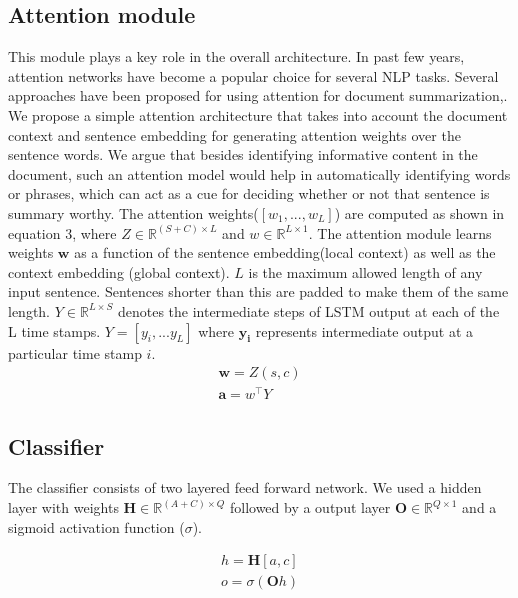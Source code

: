 \subsection{Attention module} This module plays a key role in the overall architecture. In past few years, attention networks have become a popular choice for several NLP tasks. Several approaches have been proposed for using attention for document summarization\cite{cheng2016neural},\cite{rush2015neural}. We propose a simple attention architecture that takes into account the document context and sentence embedding for generating attention weights over the sentence words. We argue that besides identifying informative content in the document, such an attention model would help in automatically identifying words or phrases, which can act as a cue for deciding whether or not that sentence is summary worthy. The attention weights($[w_1,...,w_L]$) are computed as shown in equation 3, where $Z \in \mathbb{R}^{(S+C)\times L}$ and $w \in \mathbb{R}^{L\times1}$. The attention module learns weights $\boldsymbol{w}$ as a function of the sentence embedding(local context) as well as the context embedding (global context). $L$ is the maximum allowed length of any input sentence. Sentences shorter than this are padded to make them of the same length. $Y \in \mathbb{R}^{L\times S}$ denotes the intermediate steps of LSTM output at each of the L time stamps. $Y = [y_i,...y_L]$ where $\boldsymbol{y_i}$ represents intermediate output at a particular time stamp $i$.
\vspace{-1mm}
\begin{eqnarray}
\boldsymbol{w} = Z(s,c)\\
\label{eq2}
\boldsymbol{a} = w^\intercal Y
\end{eqnarray}
\vspace{-5mm}
\subsection{Classifier} The classifier consists of two layered feed forward network. We used a hidden layer with weights $\boldsymbol{H} \in \mathbb{R}^{(A+C) \times Q}$ followed by a output layer $\boldsymbol{O} \in \mathbb{R}^{Q \times 1}$ and a sigmoid activation function ($\sigma$). 

\begin{eqnarray}
h = \boldsymbol{H}[a,c]\\
o = \sigma(\boldsymbol{O}h)
\end{eqnarray}


